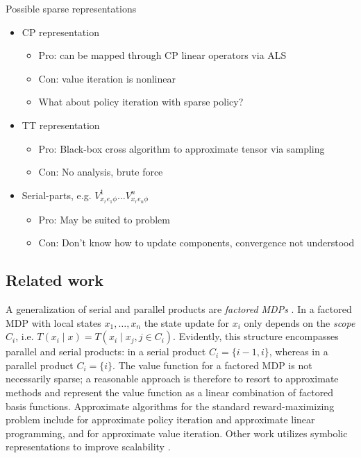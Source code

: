\documentclass[conference]{IEEEtran}
\begin{document}
Possible sparse representations
\begin{itemize}
  \item CP representation
  \begin{itemize}
    \item Pro: can be mapped through CP linear operators via ALS
    \item Con: value iteration is nonlinear
    \item What about policy iteration with sparse policy? 
  \end{itemize}
  \item TT representation
  \begin{itemize}
    \item Pro: Black-box cross algorithm to approximate tensor via sampling
    \item Con: No analysis, brute force
  \end{itemize}
  \item Serial-parts, e.g. $V^1_{x_r e_1 \phi} \ldots V^n_{x_r e_n \phi}$
  \begin{itemize}
    \item Pro: May be suited to problem
    \item Con: Don't know how to update components, convergence not understood
  \end{itemize}
\end{itemize}

\subsection{Related work}

A generalization of serial and parallel products are \emph{factored MDPs} \cite{Boutilier2000}. In a factored MDP with local states $x_1, \ldots, x_n$ the state update for $x_i$ only depends on the \emph{scope} $C_i$, i.e. $T(x_i \mid x) = T(x_i \mid x_j, j \in C_i)$. Evidently, this structure encompasses parallel and serial products: in a serial product $C_i = \{ i-1, i \}$, whereas in a parallel product $C_i = \{ i \}$. The value function for a factored MDP is not necessarily sparse; a reasonable approach is therefore to resort to approximate methods and represent the value function as a linear combination of factored basis functions. Approximate algorithms for the standard reward-maximizing problem include \cite{Guestrin2003} for approximate policy iteration and approximate linear programming, and \cite{Szita2008} for approximate value iteration. Other work utilizes symbolic representations to improve scalability \cite{Boutilier2000}.
\end{document}

